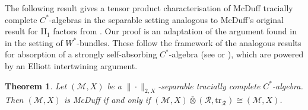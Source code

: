 \documentclass[a4paper,11pt]{amsart}
\newtheorem{theorem}{Theorem}
\theoremstyle{definition}
\numberwithin{equation}{section}
\numberwithin{theorem}{section}
\newcommand{\R}{\mathcal R}
\newcommand{\tr}{\mathrm{tr}}
\newcommand{\M}{\mathcal{M}}
\newcommand{\barotimes}{\bar\otimes}
\begin{document}
The following result gives a tensor product characterisation of McDuff tracially complete $C^*$-algebras in the separable setting analogous to McDuff's original result for II$_1$ factors from \cite{Du70}. Our proof is an adaptation of the argument found in \cite[Proposition~3.11]{BBSTWW} in the setting of $W^*$-bundles. These follow the framework of the analogous results for absorption of a strongly self-absorbing $C^*$-algebra (see \cite[Theorem~2.2]{TW07} or \cite[Theorem~7.2.2]{Rordam-Book}), which are powered by an Elliott intertwining argument.

\begin{theorem}\label{thm:McDuff-tensor}
Let $(\M, X)$ be a $\|\cdot\|_{2,X}$-separable tracially complete $C^*$-algebra.  Then $(\M, X)$ is McDuff if and only if $(\M,X) \barotimes (\R,\tr_\R) \cong (\M,X)$.
\end{theorem}
\end{document}
